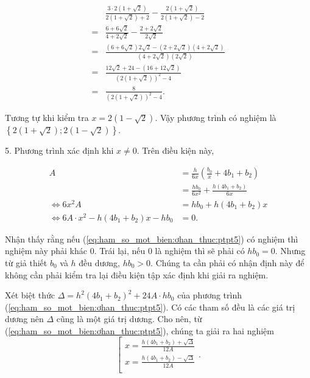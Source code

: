\begin{align*}
   &\frac{3\cdot 2(1+\sqrt{2})}{2(1+\sqrt{2}) + 2} - \frac{2(1+\sqrt{2})}{2(1+\sqrt{2}) - 2} \\
   = &\frac{6 + 6\sqrt{2}}{4 + 2\sqrt{2}} - \frac{2 + 2\sqrt{2}}{2\sqrt{2}} \\
   = &\frac{\left(6 + 6\sqrt{2}\right)2\sqrt{2} - \left(2 + 2\sqrt{2}\right)\left(4 + 2\sqrt{2}\right)}{\left(4 + 2\sqrt{2}\right)\left(2\sqrt{2}\right)} \\
   = &\frac{12\sqrt{2} + 24 - \left(16 + 12\sqrt{2}\right)}{\left(2\left(1 + \sqrt{2}\right)\right)^2 - 4} \\
   = &\frac{8}{\left(2\left(1 + \sqrt{2}\right)\right)^2 - 4}.
\end{align*}

Tương tự khi kiểm tra $x = 2\left(1 - \sqrt{2}\right)$. Vậy phương trình có nghiệm là $\left\{2\left(1 + \sqrt{2}\right); 2\left(1 - \sqrt{2}\right)\right\}$.

5. Phương trình xác định khi $x \neq 0$. Trên điều kiện này,

\begin{align}
   A &= \frac{h}{6x}\left(\frac{b_0}{x} + 4b_1 + b_2\right) \nonumber\\
   &= \frac{hb_0}{6x^2} + \frac{h\left(4b_1 + b_2\right)}{6x} \nonumber\\
   \iff 6x^2A &= hb_0 + h\left(4b_1 + b_2\right)x \nonumber\\
   \iff 6A\cdot x^2 - h\left(4b_1 + b_2\right)x - hb_0 &= 0. \label{eq:ham_so_mot_bien:ơhan_thuc:ptpt5}
\end{align}

Nhận thấy rằng nếu (\ref{eq:ham_so_mot_bien:ơhan_thuc:ptpt5}) có nghiệm thì nghiệm này phải khác $0$. Trái lại, nếu $0$ là nghiệm thì sẽ phải có $hb_0 = 0$. Nhưng từ giả thiết $b_0$ và $h$ đều dương, $hb_0 > 0$. Chúng ta cần phải có nhận định này để không cần phải kiểm tra lại điều kiện tập xác định khi giải ra nghiệm.

Xét biệt thức $\Delta = h^2(4b_1 + b_2)^2 + 24A\cdot hb_0$ của phương trình (\ref{eq:ham_so_mot_bien:ơhan_thuc:ptpt5}). Có các tham số đều là các giá trị dương nên $\Delta$ cũng là một giá trị dương. Cho nên, từ (\ref{eq:ham_so_mot_bien:ơhan_thuc:ptpt5}), chúng ta giải ra hai nghiệm
\begin{equation*}
   \left[\begin{array}{l}
      x = \frac{h\left(4b_1 + b_2\right) + \sqrt{\Delta}}{12A} \\
      x = \frac{h\left(4b_1 + b_2\right) - \sqrt{\Delta}}{12A} \\
   \end{array}\right..
\end{equation*}

